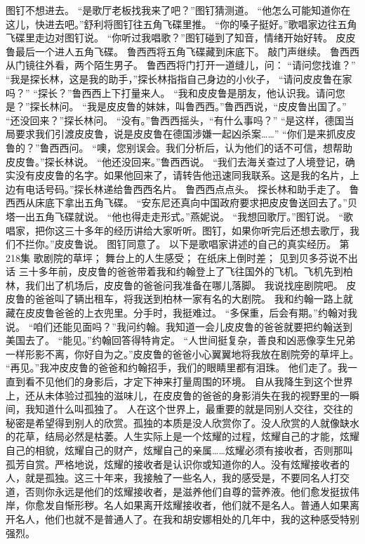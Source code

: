 \documentclass[a4paper,12pt,UTF8,twoside]{ctexbook}
\begin{document}
        图钉不想进去。 
        “是歌厅老板找我来了吧？”图钉猜测道。 
        “他怎么可能知道你在这儿，快进去吧。”舒利将图钉往五角飞碟里推。 
        “你的嗓子挺好。”歌唱家边往五角飞碟里走边对图钉说。 
        “你听过我唱歌？”图钉碰到了知音，情绪开始好转。 
        皮皮鲁最后一个进人五角飞碟。 
        鲁西西将五角飞碟藏到床底下。 
        敲门声继续。 
        鲁西西从门镜往外看，两个陌生男子。 
        鲁西西将门打开一道缝儿，问： 
        “请问您找谁？” 
        “我是探长林，这是我的助手，”探长林指指自己身边的小伙子，  “请问皮皮鲁在家吗？” 
        “探长？”鲁西西上下打量来人。 
        “我和皮皮鲁是朋友，他认识我。请问您是？”探长林问。 
        “我是皮皮鲁的妹妹，叫鲁西西。”鲁西西说，“皮皮鲁出国了。” 
        “还没回来？”探长林问。 
        “没有。”鲁西西摇头，“有什么事吗？” 
        “是这样，德国当局要求我们引渡皮皮鲁，说是皮皮鲁在德国涉嫌一起凶杀案……” 
        “你们是来抓皮皮鲁的？”鲁西西问。 
        “噢，您别误会。我们分析后，认为他们的话不可信，想帮助皮皮鲁。”探长林说。 
        “他还没回来。”鲁西西说。 
        “我们去海关查过了人境登记，确实没有皮皮鲁的名字。如果他回来了，请转告他迅速同我联系。这是我的名片，上边有电话号码。”探长林递给鲁西西名片。 
        鲁西西点点头。 
        探长林和助手走了。 
        鲁西西从床底下拿出五角飞碟。 
        “安东尼还真向中国政府要求把皮皮鲁送回去了。”贝塔一出五角飞碟就说。 
        “他也得走走形式。”燕妮说。 
        “我想回歌厅。”图钉说。 
        “歌唱家，把你这三十多年的经历讲给大家听听。图钉，如果你听完后还想去歌厅，我们不拦你。”皮皮鲁说。 
        图钉同意了。 
        以下是歌唱家讲述的自己的真实经历。   第218集 
        歌剧院的草坪； 
        舞台上的人生感受； 
        在纸床上倒时差； 
        见到贝多芬说不出话   
        三十多年前，皮皮鲁的爸爸带着我和约翰登上了飞往国外的飞机。飞机先到柏林，我们出了机场后，皮皮鲁的爸爸问我准备在哪儿落脚。 
        我说找座剧院吧。 
        皮皮鲁的爸爸叫了辆出租车，将我送到柏林一家有名的大剧院。 
        我和约翰一路上就藏在皮皮鲁爸爸的上衣兜里。分手时，我挺难过。 
        “多保重，后会有期。”约翰对我说。 
        “咱们还能见面吗？”我问约翰。我知道一会儿皮皮鲁的爸爸就要把约翰送到美国去了。 
        “能见。”约翰回答得特肯定。 
        “人世间挺复杂，善良和凶恶像孪生兄弟一样形影不离，你好自为之。”皮皮鲁的爸爸小心翼翼地将我放在剧院旁的草坪上。 
        “再见。”我冲皮皮鲁的爸爸和约翰招手，我们的眼睛里都有泪珠。 
        他们走了。我一直到看不见他们的身影后，才定下神来打量周围的环境。 
        自从我降生到这个世界上，还从未体验过孤独的滋味儿，在皮皮鲁的爸爸的身影消失在我的视野里的一瞬间，我知道什么叫孤独了。 
        人在这个世界上，最重要的就是同别人交往，交往的秘密是希望得到别人的欣赏。孤独的本质是没人欣赏你了。没人欣赏的人就像缺水的花草，结局必然是枯萎。人生实际上是一个炫耀的过程，炫耀自己的才能，炫耀自己的相貌，炫耀自己的财产，炫耀自己的亲属……炫耀必须有接收者，否则那叫孤芳自赏。严格地说，炫耀的接收者是认识你或知道你的人。没有炫耀接收者的人，就是孤独。这三十年来，我接触了一些名人，我的感受是，不要同名人打交道，否则你永远是他们的炫耀接收者，是滋养他们自尊的营养液。他们愈发挺拔伟岸，你愈发自惭形秽。名人如果离开炫耀接收者，他们就不是名人。普通人如果离开名人，他们也就不是普通人了。在我和胡安娜相处的几年中，我的这种感受特别强烈。 
\end{document}
